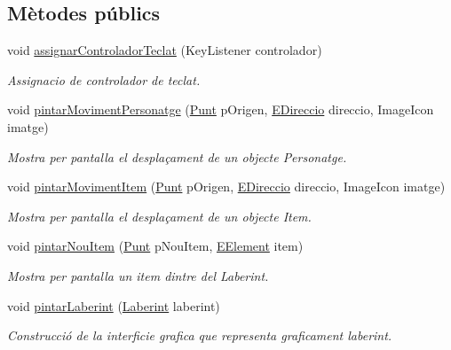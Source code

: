 \subsection*{Mètodes públics}
\begin{DoxyCompactItemize}
\item 
void \hyperlink{interfaceinterficie_1_1_i_pintador_laberint_acdd1fc6177c514b992f416ef2aa61ec2}{assignar\+Controlador\+Teclat} (Key\+Listener controlador)
\begin{DoxyCompactList}\small\item\em Assignacio de controlador de teclat. \end{DoxyCompactList}\item 
void \hyperlink{interfaceinterficie_1_1_i_pintador_laberint_aafb217de7602afc7e2534b21d9edf3fc}{pintar\+Moviment\+Personatge} (\hyperlink{classlogica_1_1_punt}{Punt} p\+Origen, \hyperlink{enumlogica_1_1enumeracions_1_1_e_direccio}{E\+Direccio} direccio, Image\+Icon imatge)
\begin{DoxyCompactList}\small\item\em Mostra per pantalla el desplaçament de un objecte Personatge. \end{DoxyCompactList}\item 
void \hyperlink{interfaceinterficie_1_1_i_pintador_laberint_ac94f8e147f795a3b75f911b36e3f4cfe}{pintar\+Moviment\+Item} (\hyperlink{classlogica_1_1_punt}{Punt} p\+Origen, \hyperlink{enumlogica_1_1enumeracions_1_1_e_direccio}{E\+Direccio} direccio, Image\+Icon imatge)
\begin{DoxyCompactList}\small\item\em Mostra per pantalla el desplaçament de un objecte Item. \end{DoxyCompactList}\item 
void \hyperlink{interfaceinterficie_1_1_i_pintador_laberint_af2f3db2e7020f3e39364deddb9c9b8a2}{pintar\+Nou\+Item} (\hyperlink{classlogica_1_1_punt}{Punt} p\+Nou\+Item, \hyperlink{enumlogica_1_1enumeracions_1_1_e_element}{E\+Element} item)
\begin{DoxyCompactList}\small\item\em Mostra per pantalla un item dintre del Laberint. \end{DoxyCompactList}\item 
void \hyperlink{interfaceinterficie_1_1_i_pintador_laberint_ad2d79f039cd3d67af2ad0d2e12f99e99}{pintar\+Laberint} (\hyperlink{classlogica_1_1laberints_1_1_laberint}{Laberint} laberint)
\begin{DoxyCompactList}\small\item\em Construcció de la interficie grafica que representa graficament laberint. \end{DoxyCompactList}\item 

\end{DoxyCompactItemize}
